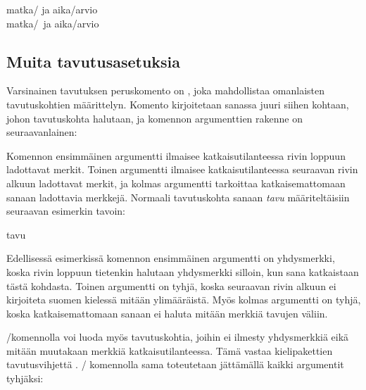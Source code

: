 \begin{tulossis}
  matka\-/{} ja aika\-/arvio \\
  matka\-/\ ja aika\-/arvio
\end{tulossis}

\subsection{Muita tavutusasetuksia}
\label{luku/tavutus-muut}

Varsinainen tavutuksen peruskomento on , joka
mahdollistaa omanlaisten tavutuskohtien määrittelyn. Komento
kirjoitetaan sanassa juuri siihen kohtaan, johon tavutuskohta halutaan,
ja komennon argumenttien rakenne on seuraavanlainen:

\begin{koodilohkosis}
\end{koodilohkosis}

\noindent
Komennon ensimmäinen argumentti  ilmaisee
katkaisutilanteessa rivin loppuun ladottavat merkit. Toinen argumentti
 ilmaisee katkaisutilanteessa seuraavan rivin alkuun
ladottavat merkit, ja kolmas argumentti tarkoittaa katkaisemattomaan
sanaan ladottavia merkkejä. Normaali tavutuskohta sanaan \emph{tavu}
määriteltäisiin seuraavan esimerkin tavoin:

\begin{koodilohkosis}
ta\discretionary{-}{}{}vu
\end{koodilohkosis}

\noindent
Edellisessä esimerkissä komennon ensimmäinen argumentti on yhdysmerkki,
koska rivin loppuun tietenkin halutaan yhdysmerkki silloin, kun sana
katkaistaan tästä kohdasta. Toinen argumentti on tyhjä, koska seuraavan
rivin alkuun ei kirjoiteta suomen kielessä mitään ylimääräistä. Myös
kolmas argumentti on tyhjä, koska katkaisemattomaan sanaan ei haluta
mitään merkkiä tavujen väliin.

\-/komennolla voi luoda myös tavutuskohtia,
joihin ei ilmesty yhdysmerkkiä eikä mitään muutakaan merkkiä
katkaisutilanteessa. Tämä vastaa kielipakettien tavutusvihjettä
\koodi{\textquotedbl\textquotedbl}. \-/
komennolla sama toteutetaan jättämällä kaikki argumentit tyhjäksi:

\begin{koodilohkosis}
\discretionary{}{}{}
\end{koodilohkosis}

